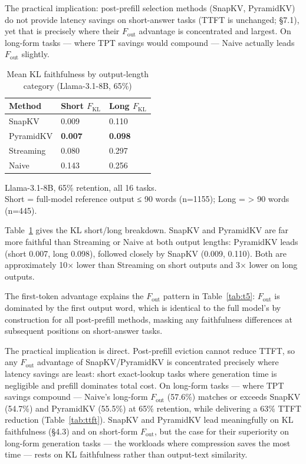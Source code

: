 \documentclass[10pt,letterpaper]{article}
\begin{document}
The practical implication: post-prefill selection methods (SnapKV, PyramidKV)
do not provide latency savings on short-answer tasks (TTFT is unchanged;
§7.1), yet that is precisely where their \(F_{\text{out}}\) advantage is
concentrated and largest. On long-form tasks --- where TPT savings would
compound --- Naive actually leads \(F_{\text{out}}\) slightly.

\begin{table}[H]
\centering
\small
\caption{Mean KL faithfulness by output-length category (Llama-3.1-8B, 65\%)}
\label{tab:t6}
\begin{tabular}{@{}lll@{}}
\toprule
Method & Short \(F_{\text{KL}}\) & Long \(F_{\text{KL}}\)\\
\midrule
SnapKV    & 0.009 & 0.110\\
PyramidKV & \textbf{0.007} & \textbf{0.098}\\
Streaming & 0.080 & 0.297\\
Naive     & 0.143 & 0.256\\
\bottomrule
\end{tabular}
\center
Llama-3.1-8B, 65\% retention, all 16 tasks.
\\Short = full-model reference output ≤ 90 words (n=1155); Long =
\textgreater{} 90 words (n=445).
\end{table}

Table~\ref{tab:t6} gives the KL short/long breakdown.
SnapKV and PyramidKV are far more faithful than Streaming or Naive at
both output lengths: PyramidKV leads (short 0.007, long 0.098), followed
closely by SnapKV (0.009, 0.110). Both are approximately 10× lower than
Streaming on short outputs and 3× lower on long outputs.

The first-token advantage explains the \(F_{\text{out}}\) pattern in Table~\ref{tab:t5}:
\(F_{\text{out}}\) is dominated by the first output word, which is
identical to the full model's by construction for all post-prefill methods,
masking any faithfulness differences at subsequent positions on short-answer tasks.

The practical implication is direct. Post-prefill eviction cannot reduce
TTFT, so any \(F_{\text{out}}\) advantage of SnapKV/PyramidKV is
concentrated precisely where latency savings are least: short exact-lookup
tasks where generation time is negligible and prefill dominates total cost.
On long-form tasks --- where TPT savings compound --- Naive's long-form
\(F_{\text{out}}\) (57.6\%) matches or exceeds SnapKV (54.7\%) and
PyramidKV (55.5\%) at 65\% retention, while delivering a 63\% TTFT reduction
(Table~\ref{tab:ttft}). SnapKV and PyramidKV lead meaningfully on KL faithfulness
(§4.3) and on short-form \(F_{\text{out}}\), but the case for their superiority
on long-form generation tasks --- the workloads where compression saves the most
time --- rests on KL faithfulness rather than output-text similarity.
\end{document}
